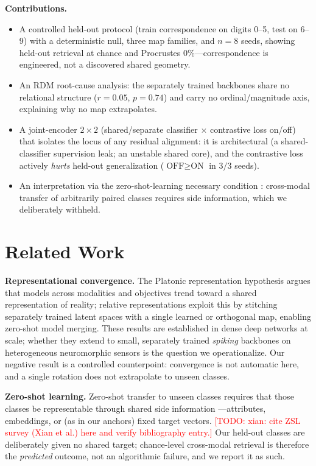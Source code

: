 \documentclass[conference]{IEEEtran}
\newcommand{\todo}[1]{\textcolor{red}{[TODO: #1]}}
\begin{document}
\noindent\textbf{Contributions.}
\begin{itemize}
  \item A controlled held-out protocol (train correspondence on digits
        0--5, test on 6--9) with a deterministic null, three map families,
        and $n{=}8$ seeds, showing held-out retrieval at chance and Procrustes
        $0\%$---correspondence is engineered, not a discovered shared geometry.
  \item An RDM root-cause analysis: the separately trained backbones share
        no relational structure ($r=0.05$, $p=0.74$) and carry no
        ordinal/magnitude axis, explaining why no map extrapolates.
  \item A joint-encoder $2{\times}2$ (shared/separate classifier $\times$
        contrastive loss on/off) that isolates the locus of any residual
        alignment: it is architectural (a shared-classifier supervision leak;
        an unstable shared core), and the contrastive loss actively
        \emph{hurts} held-out generalization ($\text{OFF}\ge\text{ON}$ in
        $3/3$ seeds).
  \item An interpretation via the zero-shot-learning necessary condition
        \cite{palatucci2009}: cross-modal transfer of arbitrarily paired
        classes requires side information, which we deliberately withheld.
\end{itemize}

\section{Related Work}\label{sec:related}
\textbf{Representational convergence.} The Platonic representation
hypothesis \cite{platonic} argues that models across modalities and
objectives trend toward a shared representation of reality; relative
representations \cite{relreps} exploit this by stitching separately trained
latent spaces with a single learned or orthogonal map, enabling zero-shot
model merging. These results are established in dense deep networks at
scale; whether they extend to small, separately trained \emph{spiking}
backbones on heterogeneous neuromorphic sensors is the question we
operationalize. Our negative result is a controlled counterpoint:
convergence is not automatic here, and a single rotation does not
extrapolate to unseen classes.

\textbf{Zero-shot learning.} Zero-shot transfer to unseen classes requires
that those classes be representable through shared side information
\cite{palatucci2009}---attributes, embeddings, or (as in our anchors) fixed
target vectors. \todo{xian: cite ZSL survey (Xian et al.) here and verify
bibliography entry.} Our held-out classes are deliberately given no shared
target; chance-level cross-modal retrieval is therefore the
\emph{predicted} outcome, not an algorithmic failure, and we report it as
such.
\end{document}
